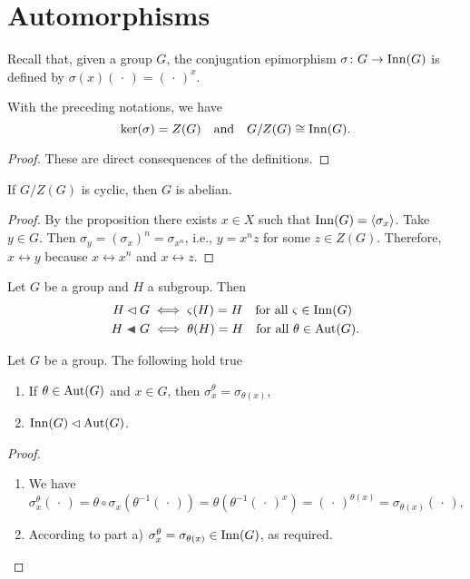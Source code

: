 \section{Automorphisms}

Recall that, given a group $G$, the conjugation epimorphism $\sigma\colon G\to{\rm Inn}(G)$ is defined by $\sigma(x)(\,\cdot\,)=(\,\cdot\,)^x$.

\begin{prop}
    With the preceding notations, we have
    $$
        \ker(\sigma)=Z(G)\quad\text{\rm and}\quad G/Z(G)\cong{\rm Inn}(G).
    $$
\end{prop}

\begin{proof} These are direct consequences of the definitions.  \end{proof}

\begin{cor}
    If $G/Z(G)$ is cyclic, then $G$ is abelian.
\end{cor}

\begin{proof} By the proposition there exists $x\in X$ such that ${\rm Inn}(G)=\langle\sigma_x\rangle$. Take $y\in G$. Then $\sigma_y=(\sigma_x)^n=\sigma_{x^n}$, i.e., $y=x^nz$ for some $z\in Z(G)$. Therefore, $x\leftrightarrow y$ because $x\leftrightarrow x^n$ and $x\leftrightarrow z$.  \end{proof}

\begin{rem} Let $G$ be a group and $H$ a subgroup. Then
\begin{align*}
    H\normal G &\iff \varsigma(H)=H\quad\text{\rm for all } \varsigma\in\Inn(G)\\
    H\ch G &\iff \theta(H)=H\quad\text{\rm for all } \theta\in\Aut(G).
\end{align*}
\end{rem}

\begin{prop}\label{Inn-normal-in-Aut}
    Let\/ $G$ be a group. The following hold true
    \begin{enumerate}[\rm a)]
        \item If\/ $\theta\in{\rm Aut}(G)$ and\/ $x\in G$, then\/ $\sigma_x^\theta=\sigma_{\theta(x)}$,
        \item ${\rm Inn}(G)\lhd{\rm Aut}(G)$.
    \end{enumerate}
\end{prop}

\begin{proof}${}$
\begin{enumerate}[\rm a)]
    \item We have
    $$
        \sigma_x^\theta(\,\cdot\,) = \theta\circ\sigma_x(\theta^{-1}(\,\cdot\,))
            = \theta(\theta^{-1}(\,\cdot\,)^x) = (\,\cdot\,)^{\theta(x)}=\sigma_{\theta(x)}(\,\cdot\,),
    $$

    \item According to part a) $\sigma_x^\theta=\sigma_{\theta(x)}\in{\rm Inn}(G)$, as required.
\end{enumerate}
\end{proof}


